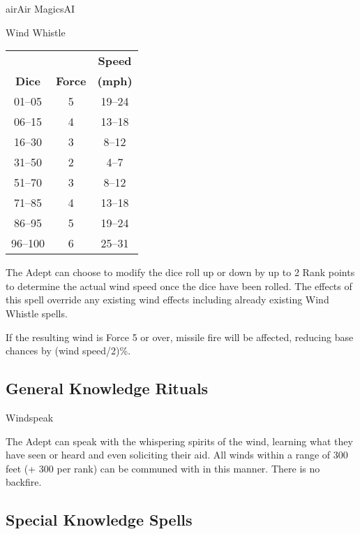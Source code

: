 \begin{college}[2.1]{air}{Air Magics}{AI}
\begin{spell}[G-9]{Wind Whistle}
\begin{effects}
\begin{tabular}{ccc}
		& 	& \textbf{Speed} \\
\textbf{Dice}& \textbf{Force}& \textbf{(mph)} \\
01--05	& 5	& 19--24 \\
06--15	& 4	& 13--18 \\
16--30	& 3	& 8--12 \\
31--50	& 2	& 4--7 \\
51--70	& 3	& 8--12 \\
71--85	& 4	& 13--18 \\
86--95	& 5	& 19--24 \\
96--100	& 6	& 25--31 \\
\end{tabular}

The Adept can choose to modify the dice roll up or down by up to 2 \x
Rank points to determine the actual wind speed once the dice have been
rolled. The effects of this spell override any existing wind effects
including already existing Wind Whistle spells.

If the resulting wind is Force 5 or over, missile fire will be
affected, reducing base chances by (wind speed/2)\%.
\end{effects}
\end{spell}

\subsection{General Knowledge Rituals}

\begin{ritual}[Q-1]{Windspeak}

\begin{effects}
The Adept can speak with the whispering spirits of the wind, learning
what they have seen or heard and even soliciting their aid. All winds
within a range of 300 feet (+ 300 per rank) can be communed with in
this manner. There is no backfire.
\end{effects}
\end{ritual}

\subsection{Special Knowledge Spells}


\end{college}
